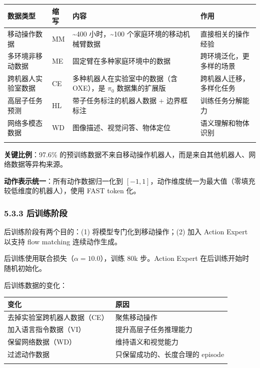 \documentclass[
  chinese,
]{ctexart}
\begin{document}
\begin{center}
\begin{tabular}{@{}>{\raggedright\arraybackslash}p{} >{\raggedright\arraybackslash}p{} >{\raggedright\arraybackslash}p{} >{\raggedright\arraybackslash}p{}@{}}
\toprule\noalign{}
数据类型 & 缩写 & 内容 & 作用 \\
\midrule\noalign{}
移动操作数据 & MM & \textasciitilde400 小时，\textasciitilde100 个家庭环境的移动机械臂数据 & 直接相关的操作经验 \\
多环境非移动数据 & ME & 固定臂在多种家庭环境中的数据 & 跨环境泛化，更多样的场景 \\
跨机器人实验室数据 & CE & 多种机器人在实验室中的数据（含 OXE），是 \(\pi_0\) 数据集的扩展版 & 跨机器人迁移，多样化任务 \\
高层子任务预测 & HL & 带子任务标注的机器人数据 + 边界框标注 & 训练任务分解能力 \\
网络多模态数据 & WD & 图像描述、视觉问答、物体定位 & 语义理解和物体识别 \\
\bottomrule\noalign{}
\end{tabular}
\end{center}

\textbf{关键比例}：97.6\%
的预训练数据不来自移动操作机器人，而是来自其他机器人、网络数据等异构来源。

\textbf{动作表示统一}：所有动作数据归一化到
\([-1, 1]\)，动作维度统一为最大值（零填充较低维度的机器人），使用 FAST
token 化。

\subsubsection{5.3.3 后训练阶段}\label{ux540eux8badux7ec3ux9636ux6bb5}

后训练阶段有两个目的：(1) 将模型专门化到移动操作；(2) 加入 Action Expert
以支持 flow matching 连续动作生成。

后训练使用联合损失（\(\alpha = 10.0\)），训练 80k 步。Action Expert
在后训练开始时随机初始化。

后训练数据的变化：

\begin{center}
\begin{tabular}{@{}>{\raggedright\arraybackslash}p{} >{\raggedright\arraybackslash}p{}@{}}
\toprule\noalign{}
变化 & 原因 \\
\midrule\noalign{}
去掉实验室跨机器人数据（CE） & 聚焦移动操作 \\
加入语言指令数据（VI） & 提升高层子任务推理能力 \\
保留网络数据（WD） & 维持语义和视觉能力 \\
过滤动作数据 & 只保留成功的、长度合理的 episode \\
\bottomrule\noalign{}
\end{tabular}
\end{center}
\end{document}
